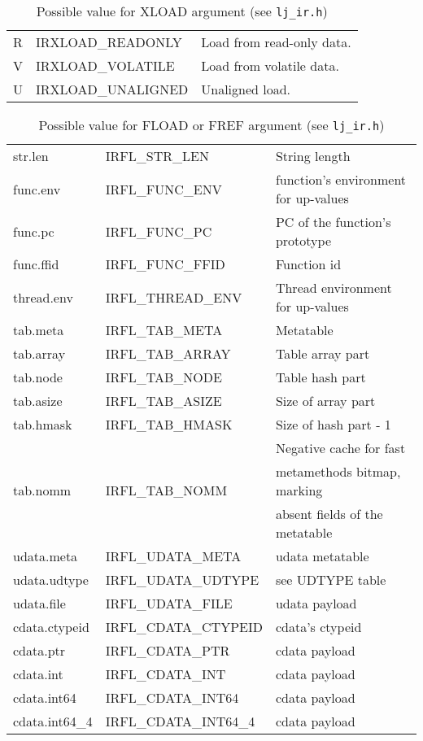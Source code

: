 \begin{table}[H]
\centering
\caption{
  Possible value for XLOAD argument (see \texttt{lj\_ir.h})
}
\label{tab:dump-xload}
\begin{tabular}{|l|l|l|}
\hline
R & IRXLOAD\_READONLY  & Load from read-only data.\\
V & IRXLOAD\_VOLATILE  & Load from volatile data.\\
U & IRXLOAD\_UNALIGNED & Unaligned load.\\
\hline
\end{tabular}
\end{table}

\begin{table}[H]
\centering
\caption{
  Possible value for FLOAD or FREF argument (see \texttt{lj\_ir.h})}
\label{tab:dump-fload-fref}
\begin{tabular}{|l|l|l|}
\hline
str.len        & IRFL\_STR\_LEN        & String length \\
func.env       & IRFL\_FUNC\_ENV       & function's environment for up-values \\
func.pc        & IRFL\_FUNC\_PC        & PC of the function's prototype \\
func.ffid      & IRFL\_FUNC\_FFID      & Function id \\
thread.env     & IRFL\_THREAD\_ENV     & Thread environment for up-values \\
tab.meta       & IRFL\_TAB\_META       & Metatable \\
tab.array      & IRFL\_TAB\_ARRAY      & Table array part \\
tab.node       & IRFL\_TAB\_NODE       & Table hash part \\
tab.asize      & IRFL\_TAB\_ASIZE      & Size of array part\\
tab.hmask      & IRFL\_TAB\_HMASK      & Size of hash part - 1\\\hline
\multirow{3}{*}{tab.nomm} & \multirow{3}{*}{IRFL\_TAB\_NOMM} & Negative cache for fast \\
& & metamethods bitmap, marking\\
& & absent fields of the metatable\\\hline
udata.meta     & IRFL\_UDATA\_META     & udata metatable\\
udata.udtype   & IRFL\_UDATA\_UDTYPE   & see UDTYPE table\\
udata.file     & IRFL\_UDATA\_FILE     & udata payload \\
cdata.ctypeid  & IRFL\_CDATA\_CTYPEID  & cdata's ctypeid\\
cdata.ptr      & IRFL\_CDATA\_PTR      & cdata payload \\
cdata.int      & IRFL\_CDATA\_INT      & cdata payload \\
cdata.int64    & IRFL\_CDATA\_INT64    & cdata payload \\
cdata.int64\_4 & IRFL\_CDATA\_INT64\_4 & cdata payload \\
\hline
\end{tabular}
\end{table}

